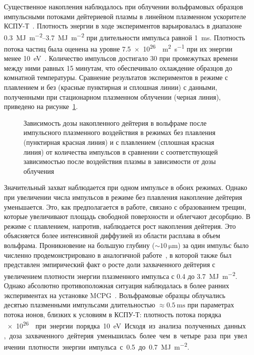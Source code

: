 Существенное накопления наблюдалось при облучении вольфрамовых образцов импульсными потоками дейтериевой плазмы в линейном плазменном ускорителе КСПУ-Т~\cite{Ogorodnikova}. Плотность энергии в ходе экспериментов варьировалась в диапазоне \SIrange{0.3}{3.7}{\mega\joule\per\meter\squared} при длительности импульса равной \SI{1}{\milli\second}. Плотность потока частиц была оценена на уровне \SI{7.5e26}{\per\meter\squared\per\second} при их энергии менее \SI{10}{\electronvolt}~\cite{Poskakalov2020}. Количество импульсов достигало 30 при промежутках времени между ними равных 15 минутам, что обеспечивало охлаждение образцов до комнатной температуры. Сравнение результатов экспериментов в режиме с плавлением и без (красные пунктирная и сплошная линии) с данными, полученными при стационарном плазменном облучении (черная линия), приведено на рисунке~\cref{fig:ch1/retention_QSPA}. 
\begin{figure}[ht]
    \caption{Зависимость дозы накопленного дейтерия в вольфраме после импульсного плазменного воздействия в режимах без плавления (пунктирная красная линия) и с плавлением (сплошная красная линия) от количества импульсов в сравнении с соответствующей зависимостью после воздействия плазмы в зависимости от дозы облучения~\cite{Ogorodnikova}}\label{fig:ch1/retention_QSPA}
\end{figure}
Значительный захват наблюдается при одном импульсе в обоих режимах. Однако при увеличении числа импульсов в режиме без плавления накопление дейтерия уменьшается. Это, как предполагается в работе, связано с образованием трещин, которые увеличивают площадь свободной поверхности и облегчают десорбцию. В режиме с плавлением, напротив, наблюдается рост накопления дейтерия. Это объясняется более интенсивной диффузией из области расплава в объем вольфрама. Проникновение на большую глубину (\( \sim \SI{10}{\micro\meter} \)) за один импульс было численно продемонстрировано в аналогичной работе~\cite{Poskakalov2020}, в которой также был представлен эмпирический факт о росте доли захваченного дейтерия с увеличением плотности энергии плазменного импульса с \num{0.4} до \SI{3.7}{\mega\joule\per\metre\squared}. Однако абсолютно противоположная ситуация наблюдалась в более ранних экспериментах на установке MCPG~\cite{Nishijima2011}. Вольфрамовые образцы облучались десятью плазменными импульсами длительностью \( \approx\SI{0.5}{\milli\second} \) при параметрах потока ионов, близких к условиям в КСПУ-Т: плотность потока порядка \SI{e26}{\per\meter\square\per\second} при энергии порядка \SI{10}{\electronvolt}. Исходя из анализа полученных данных, доза захваченного дейтерия уменьшилась более чем в четыре раза при увеличении плотности энергии импульса с \num{0.5} до \SI{0.7}{\mega\joule\per\meter\squared}.

